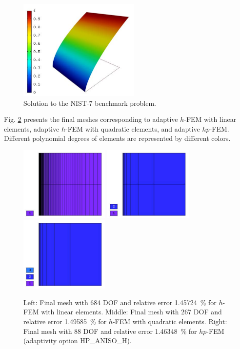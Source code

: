 \documentclass[12pt]{elsarticle}
\begin{document}
\begin{figure}[H]
\centering
\includegraphics[height=5cm]{mafig41.pdf}
\vspace{-3mm}
\caption{Solution to the NIST-7 benchmark problem.}
\label{fig:sln-nist07}
\end{figure}

Fig. \ref{fig:nist-7-hp-aniso} presents the final meshes corresponding to adaptive $h$-FEM with
linear elements, adaptive $h$-FEM with quadratic elements, and adaptive $hp$-FEM. Different
polynomial degrees of elements are represented by different colors.

\begin{figure}[H]
\centering
\includegraphics[height=3.7cm]{mafig42.pdf}
\includegraphics[height=3.7cm]{mafig43.pdf}
\includegraphics[height=3.7cm]{mafig44.pdf}
\caption{
Left: Final mesh with 684 DOF and relative error 1.45724~\% for $h$-FEM with linear elements.
Middle: Final mesh with 267 DOF and relative error 1.49585~\% for $h$-FEM with quadratic elements.
Right: Final mesh with 88 DOF and relative error 1.46348~\% for $hp$-FEM (adaptivity option HP\_ANISO\_H).}
\label{fig:nist-7-hp-aniso}
\end{figure}
\end{document}
